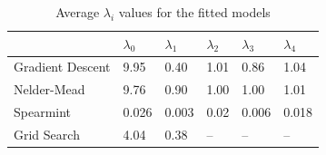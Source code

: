 \documentclass[12pt]{article}
\begin{document}
\begin{table}
\caption {\label{tab:additive_average_lambda} Average $\lambda_i$ values for the fitted models}
\centering
\begin{tabular}{| l | l | l | l | l | l | }
\hline
& $\lambda_0$ & $\lambda_1$ & $\lambda_2$ & $\lambda_3$ & $\lambda_4$\\
\hline
Gradient Descent & 9.95 & 0.40 & 1.01 & 0.86 & 1.04 \\
\hline
Nelder-Mead & 9.76 & 0.90 & 1.00 & 1.00 & 1.01 \\
\hline
Spearmint & 0.026 & 0.003 & 0.02 & 0.006 & 0.018\\
\hline
Grid Search & 4.04 & 0.38 & -- & -- & -- \\
\hline
\end{tabular}
\end{table}
\end{document}
